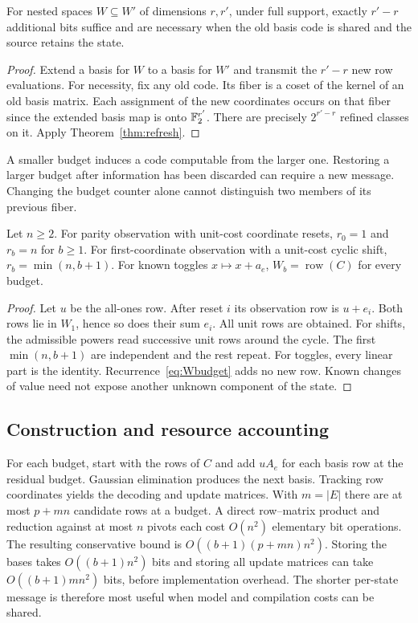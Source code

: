 \begin{corollary}\label{cor:linearrepair}
For nested spaces $W\subseteq W'$ of dimensions $r,r'$, under full support, exactly $r'-r$ additional bits suffice and are necessary when the old basis code is shared and the source retains the state.
\end{corollary}
\begin{proof}
Extend a basis for $W$ to a basis for $W'$ and transmit the $r'-r$ new row evaluations. For necessity, fix any old code. Its fiber is a coset of the kernel of an old basis matrix. Each assignment of the new coordinates occurs on that fiber since the extended basis map is onto $\mathbb F_2^{r'}$. There are precisely $2^{r'-r}$ refined classes on it. Apply Theorem~\ref{thm:refresh}.
\end{proof}
A smaller budget induces a code computable from the larger one. Restoring a larger budget after information has been discarded can require a new message. Changing the budget counter alone cannot distinguish two members of its previous fiber.

\begin{proposition}\label{prop:families}
Let $n\ge2$. For parity observation with unit-cost coordinate resets, $r_0=1$ and $r_b=n$ for $b\ge1$. For first-coordinate observation with a unit-cost cyclic shift, $r_b=\min(n,b+1)$. For known toggles $x\mapsto x+a_e$, $W_b=\operatorname{row}(C)$ for every budget.
\end{proposition}
\begin{proof}
Let $u$ be the all-ones row. After reset $i$ its observation row is $u+e_i$. Both rows lie in $W_1$, hence so does their sum $e_i$. All unit rows are obtained. For shifts, the admissible powers read successive unit rows around the cycle. The first $\min(n,b+1)$ are independent and the rest repeat. For toggles, every linear part is the identity. Recurrence~\eqref{eq:Wbudget} adds no new row. Known changes of value need not expose another unknown component of the state.
\end{proof}

\subsection{Construction and resource accounting}
For each budget, start with the rows of $C$ and add $uA_e$ for each basis row at the residual budget. Gaussian elimination produces the next basis. Tracking row coordinates yields the decoding and update matrices. With $m=|E|$ there are at most $p+mn$ candidate rows at a budget. A direct row--matrix product and reduction against at most $n$ pivots each cost $O(n^2)$ elementary bit operations. The resulting conservative bound is $O((b+1)(p+mn)n^2)$. Storing the bases takes $O((b+1)n^2)$ bits and storing all update matrices can take $O((b+1)mn^2)$ bits, before implementation overhead. The shorter per-state message is therefore most useful when model and compilation costs can be shared.
